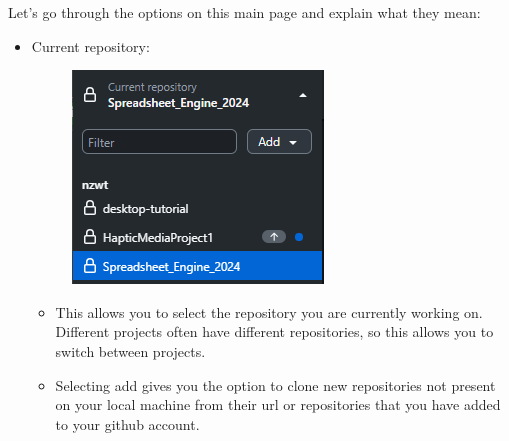 \documentclass{article}
\begin{document}
    Let's go through the options on this main page and explain what they mean:
    \begin{itemize}
        \item Current repository:
\begin{figure}
    \centering
    \includegraphics[width=0.5\linewidth]{repositories.png}
\end{figure}
        \begin{itemize}
                \item This allows you to select the repository you are currently working on. Different projects often have different repositories, so this allows you to switch between projects. 
                \item Selecting add gives you the option to clone new repositories not present on your local machine from their url or repositories that you have added to your github account.



\end{itemize}
\end{itemize}
\end{document}
